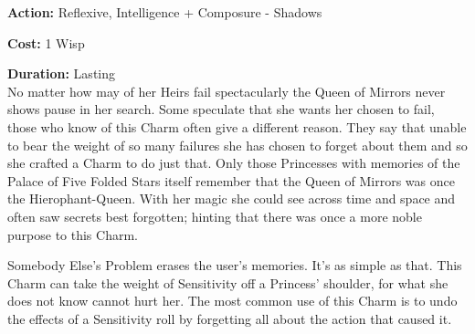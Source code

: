 \noindent \textbf{Action:} Reflexive, Intelligence + Composure - Shadows

\noindent \textbf{Cost:} 1 Wisp

\noindent \textbf{Duration:} Lasting \\

No matter how may of her Heirs fail spectacularly the Queen of Mirrors never shows pause in her search. Some speculate that she wants her chosen to fail, those who know of this Charm often give a different reason. They say that unable to bear the weight of so many failures she has chosen to forget about them and so she crafted a Charm to do just that. Only those Princesses with memories of the Palace of Five Folded Stars itself remember that the Queen of Mirrors was once the Hierophant-Queen. With her magic she could see across time and space and often saw secrets best forgotten; hinting that there was once a more noble purpose to this Charm.

Somebody Else's Problem erases the user's memories. It's as simple as that. This Charm can take the weight of Sensitivity off a Princess' shoulder, for what she does not know cannot hurt her. The most common use of this Charm is to undo the effects of a Sensitivity roll by forgetting all about the action that caused it.

